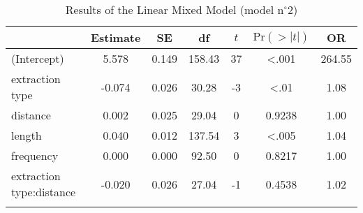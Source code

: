 \begin{table}
\begin{tabularx}{\textwidth}{Q S[table-format=-1.3] S[table-format=1.3] S[table-format=3.2] S[table-format=-1] S[table-format=<1.4] S[table-format=3.2]}
  \lsptoprule
 & {Estimate} & {SE} & {df} & {$t$} & {$\text{Pr}(>|t|)$} & {OR} \\ 
  \midrule
(Intercept) & 5.578 & 0.149 & 158.43 & 37 & <.001 & 264.55 \\ 
  extraction type & -0.074 & 0.026 & 30.28 & -3 & <.01 & 1.08 \\ 
  distance & 0.002 & 0.025 & 29.04 & 0 & 0.9238 & 1.00 \\ 
  length & 0.040 & 0.012 & 137.54 & 3 & <.005 & 1.04 \\ 
  frequency & 0.000 & 0.000 & 92.50 & 0 & 0.8217 & 1.00 \\ 
  extraction type:distance & -0.020 & 0.026 & 27.04 & -1 & 0.4538 & 1.02 \\ 
   \lspbottomrule
\end{tabularx}
\caption{Results of the Linear Mixed Model (model n$^{\circ}$2)}
\label{tab:exp03-m2}
\end{table}
